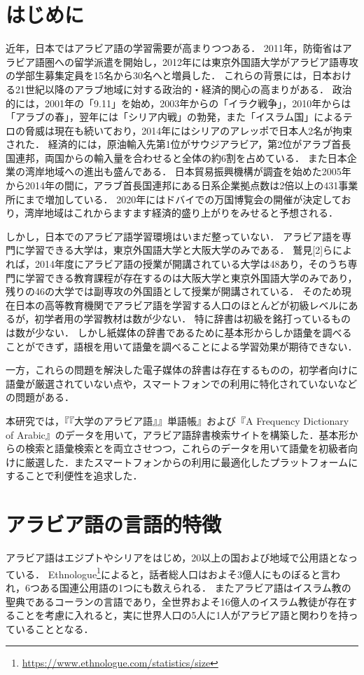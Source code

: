 \documentclass[technicalreport]{ieicej}
\begin{document}
\section{はじめに}
近年，日本ではアラビア語の学習需要が高まりつつある．
2011年，防衛省はアラビア語圏への留学派遣を開始し\cite{nikkei}，2012年には東京外国語大学がアラビア語専攻の学部生募集定員を15名から30名へと増員した．
これらの背景には，日本おける21世紀以降のアラブ地域に対する政治的・経済的関心の高まりがある．
政治的には，2001年の「9.11」を始め，2003年からの「イラク戦争」，2010年からは「アラブの春」，翌年には「シリア内戦」の勃発，また「イスラム国」によるテロの脅威は現在も続いており，2014年にはシリアのアレッポで日本人2名が拘束された．
経済的には，原油輸入先第1位がサウジアラビア，第2位がアラブ首長国連邦，両国からの輸入量を合わせると全体の約6割を占めている\cite{teikoku}．
また日本企業の湾岸地域への進出も盛んである．
日本貿易振興機構が調査を始めた2005年から2014年の間に，アラブ首長国連邦にある日系企業拠点数は2倍以上の431事業所にまで増加している\cite{jetro}．
2020年にはドバイでの万国博覧会の開催が決定しており，湾岸地域はこれからますます経済的盛り上がりをみせると予想される．

しかし，日本でのアラビア語学習環境はいまだ整っていない．
アラビア語を専門に学習できる大学は，東京外国語大学と大阪大学のみである．
鷲見[2]らによれば，2014年度にアラビア語の授業が開講されている大学は48あり，そのうち専門に学習できる教育課程が存在するのは大阪大学と東京外国語大学のみであり，残りの46の大学では副専攻の外国語として授業が開講されている．
そのため現在日本の高等教育機関でアラビア語を学習する人口のほとんどが初級レベルにあるが，初学者用の学習教材は数が少ない．
特に辞書は初級を銘打っているものは数が少ない．
しかし紙媒体の辞書であるために基本形からしか語彙を調べることができず，語根を用いて語彙を調べることによる学習効果が期待できない．

一方，これらの問題を解決した電子媒体の辞書は存在するものの，初学者向けに語彙が厳選されていない点や，スマートフォンでの利用に特化されていないなどの問題がある．

本研究では，『『大学のアラビア語』』単語帳』および『A Frequency Dictionary of Arabic』のデータを用いて，アラビア語辞書検索サイトを構築した．基本形からの検索と語彙検索とを両立させつつ，これらのデータを用いて語彙を初級者向けに厳選した．またスマートフォンからの利用に最適化したプラットフォームにすることで利便性を追求した．

\section{アラビア語の言語的特徴}
アラビア語はエジプトやシリアをはじめ，20以上の国および地域で公用語となっている．
Ethnologue\footnote{\url{https://www.ethnologue.com/statistics/size}}によると，話者総人口はおよそ3億人にものぼると言われ，6つある国連公用語の1つにも数えられる．
またアラビア語はイスラム教の聖典であるコーランの言語であり，全世界およそ16億人のイスラム教徒が存在することを考慮に入れると，実に世界人口の5人に1人がアラビア語と関わりを持っていることとなる．
\end{document}
